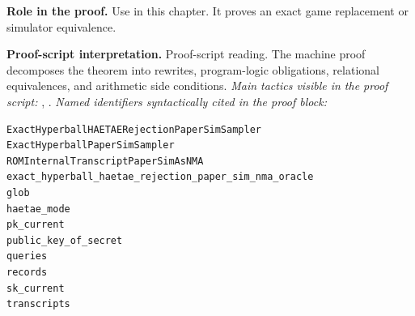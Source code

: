 \begin{formaltheorem}
\noindent\textbf{Role in the proof.}
Use in this chapter. It proves an exact game replacement or simulator equivalence.

\noindent\textbf{Proof-script interpretation.}
Proof-script reading. The machine proof decomposes the theorem into rewrites, program-logic obligations, relational equivalences, and arithmetic side conditions.
\emph{Main tactics visible in the proof script:} , .
\emph{Named identifiers syntactically cited in the proof block:}
\begin{lstlisting}[language=EasyCrypt,basicstyle=\ttfamily\scriptsize]
ExactHyperballHAETAERejectionPaperSimSampler
ExactHyperballPaperSimSampler
ROMInternalTranscriptPaperSimAsNMA
exact_hyperball_haetae_rejection_paper_sim_nma_oracle
glob
haetae_mode
pk_current
public_key_of_secret
queries
records
sk_current
transcripts
\end{lstlisting}

\end{formaltheorem}

